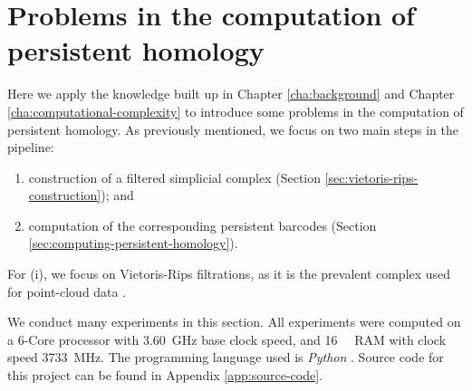 \chapter{Problems in the computation of persistent homology}
\label{cha:problems}

Here we apply the knowledge built up in Chapter \ref{cha:background} and Chapter \ref{cha:computational-complexity} to introduce some problems in the computation of persistent homology. As previously mentioned, we focus on two main steps in the pipeline:
\begin{enumerate}
    \item construction of a filtered simplicial complex (Section \ref{sec:vietoris-rips-construction}); and
    \item computation of the corresponding persistent barcodes (Section \ref{sec:computing-persistent-homology}).
\end{enumerate}
For (i), we focus on Vietoris-Rips filtrations, as it is the prevalent complex used for point-cloud data \cite{otter2017roadmap}. 

We conduct many experiments in this section. All experiments were computed on a 6-Core processor with \SI{3.60}{\giga\hertz} base clock speed, and \SI{16}{\giga\byte} RAM with clock speed \SI{3733}{\mega\hertz}. The programming language used is \emph{Python} \cite{10.5555/1593511}. Source code for this project can be found in Appendix \ref{app:source-code}.



